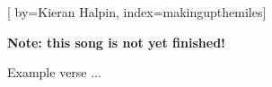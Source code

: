 

[%
    by={Kieran Halpin},
    index={makingupthemiles}]


    \label{makingupthemiles}

    \textbf{Note: this song is not yet finished!}

    \beginverse
        Example verse ...
    \endverse
\endsong
